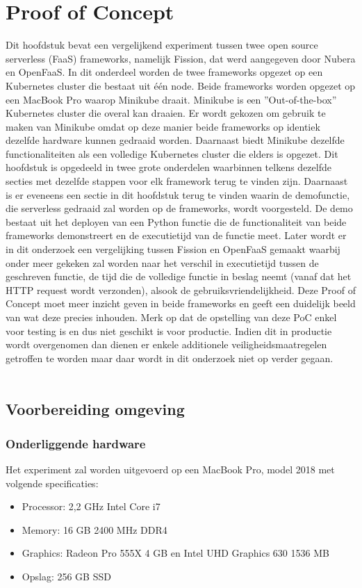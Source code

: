 \chapter{Proof of Concept}
\label{ch:proof-of-concept}
Dit hoofdstuk bevat een vergelijkend experiment tussen twee open source serverless (FaaS) frameworks, namelijk Fission, dat werd aangegeven door Nubera en OpenFaaS. In dit onderdeel worden de twee frameworks opgezet op een Kubernetes cluster die bestaat uit één node. Beide frameworks worden opgezet op een MacBook Pro waarop Minikube draait. Minikube is een ''Out-of-the-box'' Kubernetes cluster die overal kan draaien. Er wordt gekozen om gebruik te maken van Minikube omdat op deze manier beide frameworks op identiek dezelfde hardware kunnen gedraaid worden. Daarnaast biedt Minikube dezelfde functionaliteiten als een volledige Kubernetes cluster die elders is opgezet. Dit hoofdstuk is opgedeeld in twee grote onderdelen waarbinnen telkens dezelfde secties met dezelfde stappen voor elk framework terug te vinden zijn. Daarnaast is er eveneens een sectie in dit hoofdstuk terug te vinden waarin de demofunctie, die serverless gedraaid zal worden op de frameworks, wordt voorgesteld. De demo bestaat uit het deployen van een Python functie die de functionaliteit van beide frameworks demonstreert en de executietijd van de functie meet. Later wordt er in dit onderzoek een vergelijking tussen Fission en OpenFaaS gemaakt waarbij onder meer gekeken zal worden naar het verschil in executietijd tussen de geschreven functie, de tijd die de volledige functie in beslag neemt (vanaf dat het HTTP request wordt verzonden), alsook de gebruiksvriendelijkheid. Deze Proof of Concept moet meer inzicht geven in beide frameworks en geeft een duidelijk beeld van wat deze precies inhouden. Merk op dat de opstelling van deze PoC enkel voor testing is en dus niet geschikt is voor productie. Indien dit in productie wordt overgenomen dan dienen er enkele additionele veiligheidsmaatregelen getroffen te worden maar daar wordt in dit onderzoek niet op verder gegaan.
\\\\
\section{Voorbereiding omgeving}
\label{sec:voorbereiding-omgeving}
\subsection{Onderliggende hardware}
Het experiment zal worden uitgevoerd op een MacBook Pro, model 2018 met volgende specificaties:
\begin{itemize}
    \item Processor: 2,2 GHz Intel Core i7
    \item Memory: 16 GB 2400 MHz DDR4
    \item Graphics: Radeon Pro 555X 4 GB en Intel UHD Graphics 630 1536 MB
    \item Opslag: 256 GB SSD
\end{itemize}

